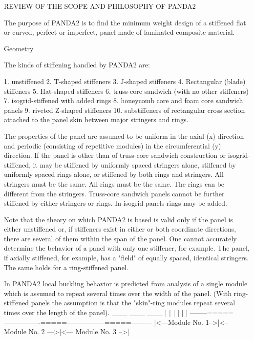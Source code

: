        REVIEW OF THE SCOPE AND PHILOSOPHY  OF PANDA2

The purpose of PANDA2 is to find the minimum weight design of a stiffened
flat or curved, perfect or imperfect, panel made of laminated composite
material. 


Geometry

The kinds of stiffening handled by PANDA2 are: 

 1. unstiffened
 2. T-shaped stiffeners
 3. J-shaped stiffeners
 4. Rectangular (blade) stiffeners
 5. Hat-shaped stiffeners
 6. truss-core sandwich (with no other
    stiffeners)
 7. isogrid-stiffened with added rings
 8. honeycomb core and foam core sandwich panels
 9. riveted Z-shaped stiffeners
10. substiffeners of rectangular cross section
    attached to the panel skin between major
    stringers and rings.

The properties of the panel are assumed to be uniform in the axial (x)
direction and periodic (consisting of repetitive modules) in the
circumferential (y) direction.  If the panel is other than of truss-core
sandwich construction or isogrid-stiffened, it may be stiffened by
uniformly spaced stringers alone, stiffened by uniformly spaced rings
alone, or stiffened by both rings and stringers. All stringers must be the
same. All rings must be the same. The rings can be different from the
stringers. Truss-core sandwich panels cannot be further stiffened by
either stringers or rings. In isogrid panels rings may be added. 

Note that the theory on which PANDA2 is based is valid only if the panel
is either unstiffened or, if stiffeners exist in either or both coordinate
directions, there are several of them within the span of the panel. One
cannot accurately determine the behavior of a panel with only one
stiffener, for example.  The panel, if axially stiffened, for example, has
a "field" of equally spaced, identical stringers. The same holds for a
ring-stiffened panel. 

In PANDA2 local buckling behavior is predicted from analysis of a single
module which is assumed to repeat several times over the width of the
panel. (With ring-stiffened panels the assumption is that the "skin"-ring
modules repeat several times over the length of the panel).
         ___                  ___                   ___
          |                    |                     |
          |                    |                     |
--------=====----------------=====-----------------=====---------
|<---Module No. 1-->|<-- Module No. 2 --->|<--- Module No. 3 -->|

